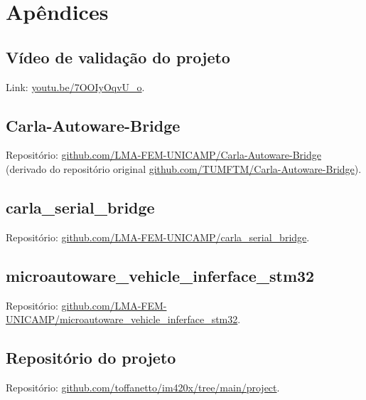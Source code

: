 \thispagestyle{plain}
\section*{Apêndices}

\subsection*{Vídeo de validação do projeto}

Link: \href{https://youtu.be/7OOIyOqvU_o}{youtu.be/7OOIyOqvU\_o}.

\subsection*{Carla-Autoware-Bridge}

Repositório: \href{https://github.com/LMA-FEM-UNICAMP/Carla-Autoware-Bridge}{github.com/LMA-FEM-UNICAMP/Carla-Autoware-Bridge} (derivado do repositório original \href{https://github.com/TUMFTM/Carla-Autoware-Bridge}{github.com/TUMFTM/Carla-Autoware-Bridge}).

\subsection*{carla\_serial\_bridge}

Repositório: \href{https://github.com/LMA-FEM-UNICAMP/carla_serial_bridge}{github.com/LMA-FEM-UNICAMP/carla\_serial\_bridge}.

\subsection*{microautoware\_vehicle\_inferface\_stm32}

Repositório: \href{https://github.com/LMA-FEM-UNICAMP/microautoware_vehicle_inferface_stm32/tree/humble}{github.com/LMA-FEM-UNICAMP/microautoware\_vehicle\_inferface\_stm32}.

\subsection*{Repositório do projeto}

Repositório: \href{https://github.com/toffanetto/im420x/tree/main/project}{github.com/toffanetto/im420x/tree/main/project}.